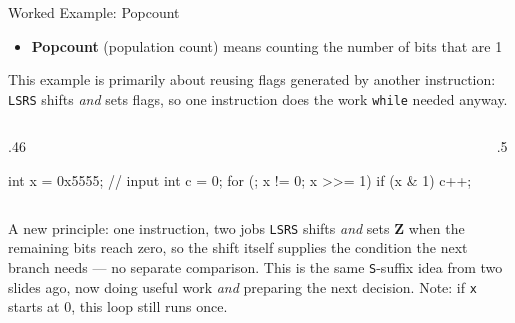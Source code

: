 \documentclass[9pt,aspectratio=169,xcolor=table]{beamer}
\begin{document}
\begin{frame}[fragile]{Worked Example: Popcount}
    \begin{itemize}
        \item \textbf{Popcount} (population count) means counting the number of bits that are 1
    \end{itemize}

    \vspace{1mm}
    {\small This example is primarily about \alert{reusing flags generated by
    another instruction}: \texttt{LSRS} shifts \emph{and} sets flags, so one
    instruction does the work \texttt{while} needed anyway.}

    \vspace{2mm}
    \begin{columns}[T]
    \begin{column}{.46\textwidth}
        \begin{cc}
int x = 0x5555;   // input
int c = 0;
for (; x != 0; x >>= 1)
    if (x & 1)
        c++;
        \end{cc}
    \end{column}
    \begin{column}{.5\textwidth}
    \end{column}
    \end{columns}

    \vspace{3mm}
    \begin{block}{A new principle: one instruction, two jobs}
        \alert{\texttt{LSRS}} shifts \emph{and} sets \textbf{Z} when the
        remaining bits reach zero, so the shift itself supplies the
        condition the next branch needs --- no separate comparison.
        This is the same \texttt{S}-suffix idea from two slides ago,
        now doing useful work \emph{and} preparing the next decision.
        Note: if \texttt{x} starts at 0, this loop still runs once.
    \end{block}
\end{frame}
\end{document}
